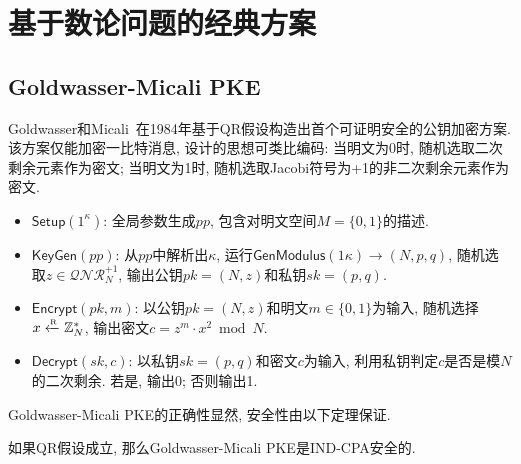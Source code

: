 \section{基于数论问题的经典方案}
\subsection{Goldwasser-Micali PKE}
Goldwasser和Micali~\cite{GM-JCSS-1984}在1984年基于QR假设构造出首个可证明安全的公钥加密方案. 
该方案仅能加密一比特消息, 设计的思想可类比编码: 当明文为0时, 随机选取二次剩余元素作为密文; 
当明文为1时, 随机选取Jacobi符号为+1的非二次剩余元素作为密文.  
\begin{construction}
\begin{itemize}
\item $\mathsf{Setup}(1^\kappa)$: 全局参数生成$pp$, 包含对明文空间$M = \{0,1\}$的描述. 

\item $\mathsf{KeyGen}(pp)$: 从$pp$中解析出$\kappa$, 运行$\mathsf{GenModulus}(1\kappa) \rightarrow (N, p, q)$, 
	随机选取$z \in \mathcal{QNR}_N^{+1}$, 输出公钥$pk = (N, z)$和私钥$sk = (p, q)$. 

\item $\mathsf{Encrypt}(pk, m)$: 以公钥$pk = (N, z)$和明文$m \in \{0,1\}$为输入, 随机选择$x \xleftarrow{\textup{\tiny R}} \mathbb{Z}_N^*$, 
	输出密文$c = z^m \cdot x^2 \bmod N$. 

\item $\mathsf{Decrypt}(sk, c)$: 以私钥$sk = (p, q)$和密文$c$为输入, 利用私钥判定$c$是否是模$N$的二次剩余. 
	若是, 输出0; 否则输出1.  
\end{itemize}
\end{construction} 

Goldwasser-Micali PKE的正确性显然, 安全性由以下定理保证. 
\begin{theorem}\label{theorem:Goldwasser-Micali-PKE-CPA}
如果QR假设成立, 那么Goldwasser-Micali PKE是IND-CPA安全的. 
\end{theorem}

